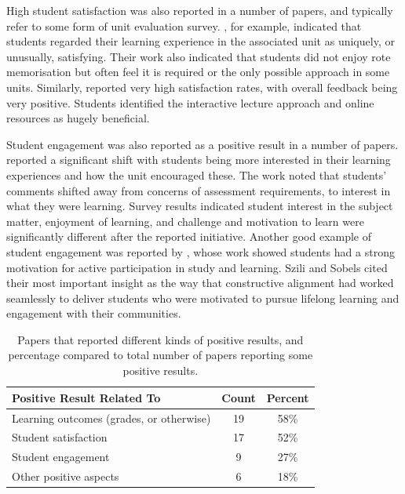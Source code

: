 High student satisfaction was also reported in a number of papers, and typically refer to some form of unit evaluation survey.  \citet{shepherd2005weaving}, for example, indicated that students regarded their learning experience in the associated unit as uniquely, or unusually, satisfying. Their work also indicated that students did not enjoy rote memorisation but often feel it is required or the only possible approach in some units. Similarly, \citet{scott2009promoting} reported very high satisfaction rates, with overall feedback being very positive. Students identified the interactive lecture approach and online resources as hugely beneficial.

Student engagement was also reported as a positive result in a number of papers. \citet{Davey:2002} reported a significant shift with students being more interested in their learning experiences and how the unit encouraged these. The work noted that students' comments shifted away from concerns of assessment requirements, to interest in what they were learning. Survey results indicated student interest in the subject matter, enjoyment of learning, and challenge and motivation to learn were significantly different after the reported initiative. Another good example of student engagement was reported by \citet{Szili:2011}, whose work showed students had a strong motivation for active participation in study and learning. Szili and Sobels cited their most important insight as the way that constructive alignment had worked seamlessly to deliver students who were motivated to pursue lifelong learning and engagement with their communities.

\begin{table}[htbp]
	\centering
	\caption{Papers that reported different kinds of positive results, and percentage compared to total number of papers reporting some positive results.}
	\label{tbl:pos_results}
	\footnotesize
    \begin{tabular}{l|c|c}
     \textbf{Positive Result Related To} & \textbf{Count} & \textbf{Percent} \\ \hline
	Learning outcomes (grades, or otherwise)	 & 19 &	58\% \\
	Student satisfaction	 & 17 &	52\% \\
	Student engagement & 	9 &	27\% \\
	Other positive aspects & 	6 &	18\% \\
    \end{tabular}
\end{table}

